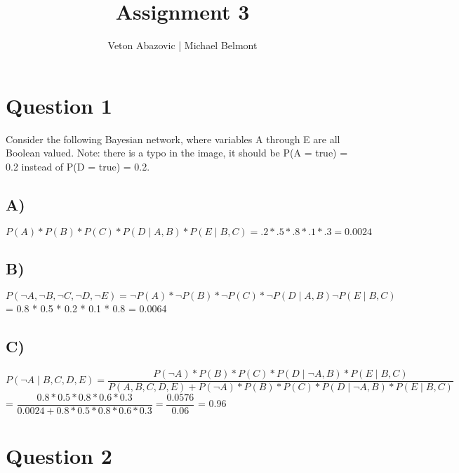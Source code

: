 \documentclass{article}
\author{Veton Abazovic | Michael Belmont}
\title{\vspace{-1.5cm}            %
Assignment 3}
\begin{document}
\maketitle
\setlength{\parindent}{0pt}
\section*{Question 1}
Consider the following Bayesian network, where variables A through E are all Boolean valued.
Note: there is a typo in the image, it should be P(A = true) = 0.2 instead of P(D = true) = 0.2.
	\subsection*{A)}
	$P(A)*P(B)*P(C)*P(D\mid A,B)*P(E\mid B,C) = 
.2*.5*.8*.1*.3 = 0.0024$
	\subsection*{B)}
	$P(\neg A, \neg B, \neg C, \neg D, \neg E) = \neg P(A) * \neg P(B) * \neg P(C) * \neg P(D\mid A,B) \neg P(E\mid B,C)$
	\newline
	= 0.8 * 0.5 * 0.2 * 0.1 * 0.8 = 0.0064
	\subsection*{C)}
	$P(\neg A\mid B,C,D,E) = \dfrac{P(\neg A) * P(B) * P(C) * P(D\mid \neg A, B) * P(E\mid B,C)}{P(A,B,C,D,E) + P(\neg A) * P(B) * P(C) * P(D\mid \neg A,B) * P(E\mid B,C)}$
	\newline
	\newline
	= $\dfrac{0.8 * 0.5 * 0.8 * 0.6 * 0.3}{0.0024 + 0.8 * 0.5 * 0.8 * 0.6 * 0.3} = \dfrac{0.0576}{0.06}$
	\newline
	\newline
	= 0.96
\section*{Question 2}
\end{document}
